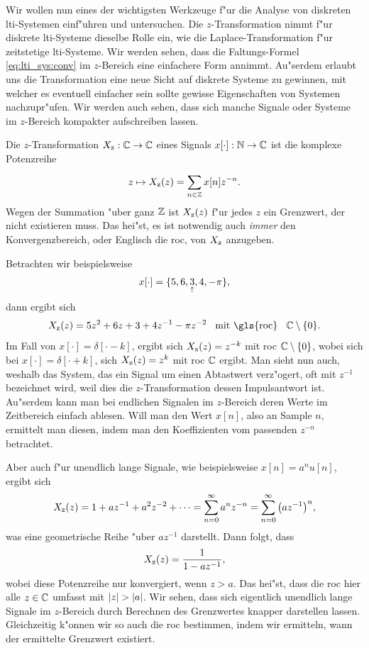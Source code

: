 Wir wollen nun eines der wichtigsten Werkzeuge f"ur die Analyse von diskreten \gls{lti}-Systemen einf"uhren und untersuchen.
Die $z$-Transformation nimmt f"ur diskrete \gls{lti}-Systeme dieselbe Rolle ein, wie die Laplace-Transformation f"ur zeitstetige \gls{lti}-Systeme.
Wir werden sehen, dass die Faltungs-Formel \eqref{eq:lti_sys:conv} im $z$-Bereich eine einfachere Form annimmt.
Au"serdem erlaubt uns die Transformation eine neue Sicht auf diskrete Systeme zu gewinnen, mit welcher es eventuell einfacher sein sollte gewisse Eigenschaften von Systemen nachzupr"ufen.
Wir werden auch sehen, dass sich manche Signale oder Systeme im $z$-Bereich kompakter aufschreiben lassen.

Die $z$-Transformation $X_{\rm z}: \mathbb{C} \rightarrow \mathbb{C}$ eines Signals $x[\cdot] : \mathbb{N} \rightarrow \mathbb{C}$ ist die komplexe Potenzreihe
\begin{equation}\label{eq:ztrafo:def}
    z \mapsto X_{\rm z}(z) = {\sum\limits_{n\in\mathbb{Z}}^{}{x[n] z^{-n}}}.
\end{equation}
Wegen der Summation "uber ganz $\mathbb{Z}$ ist $X_{\rm z}(z)$ f"ur jedes $z$ ein Grenzwert, der nicht existieren muss.
Das hei"st, es ist notwendig auch \emph{immer} den Konvergenzbereich, oder Englisch die \gls{roc}, von $X_{\rm z}$ anzugeben.

Betrachten wir beispielsweise \[x[\cdot] = \{5,6,\underset{\uparrow}{3},4,-\pi\},\] dann ergibt sich \[X_\z(z) = 5 z^2 + 6 z + 3 + 4z^{-1} - \pi z^{-2} \Text{mit \gls{roc}} \C \setminus \{0\}.\] 
Im Fall von $x[\cdot] = \delta[\cdot-k]$, ergibt sich $X_{\rm z}(z) = z^{-k}$ mit \gls{roc} $\mathbb{C} \setminus \{0\}$, wobei sich bei $x[\cdot] = \delta[\cdot+k]$, sich $X_{\rm z}(z) = z^{k}$ mit \gls{roc} $\mathbb{C}$ ergibt.
Man sieht nun auch, weshalb das System, das ein Signal um einen Abtastwert verz"ogert, oft mit $z^{-1}$ bezeichnet wird, weil dies die $z$-Transformation dessen Impulsantwort ist.
Au"serdem kann man bei endlichen Signalen im $z$-Bereich deren Werte im Zeitbereich einfach ablesen. 
Will man den Wert $x[n]$, also an Sample $n$, ermittelt man diesen, indem man den Koeffizienten vom passenden $z^{-n}$ betrachtet. 

Aber auch f"ur unendlich lange Signale, wie beispielsweise $x[n] = a^n u[n]$, ergibt sich
\[
X_{\rm z}(z) 
    = 1 + a z^{-1} + a^2 z^{-2} + \dots
    = {\sum\limits_{n = 0}^{\infty}{
        a^n z^{-n}
    }}
    = {\sum\limits_{n = 0}^{\infty}{
        \left(a z^{-1}\right)^n
    }},
\]
was eine geometrische Reihe "uber $az^{-1}$ darstellt. 
Dann folgt, dass
\[
    X_{\rm z}(z) = \frac{1}{1 - a z^{-1}},
\]
wobei diese Potenzreihe nur konvergiert, wenn $z > a$.
Das hei"st, dass die \gls{roc} hier alle $z \in \mathbb{C}$ umfasst mit ${\left| z \right|} > {\left| a \right|}$.
Wir sehen, dass sich eigentlich unendlich lange Signale im $z$-Bereich durch Berechnen des Grenzwertes knapper darstellen lassen.
Gleichzeitig k"onnen wir so auch die \gls{roc} bestimmen, indem wir ermitteln, wann der ermittelte Grenzwert existiert.

